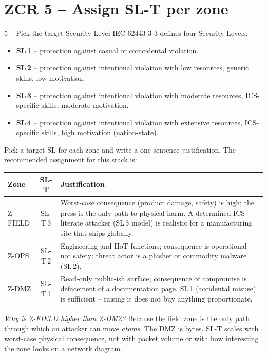 \documentclass[11pt,a4paper]{article}
\begin{document}
\section*{ZCR 5 -- Assign SL-T per zone}

\begin{stepbox}{5 -- Pick the target Security Level}
IEC 62443-3-3 defines four Security Levels:
\begin{itemize}\setlength{\itemsep}{1pt}
  \item \textbf{SL\,1} -- protection against casual or coincidental violation.
  \item \textbf{SL\,2} -- protection against intentional violation with low resources, generic skills, low motivation.
  \item \textbf{SL\,3} -- protection against intentional violation with moderate resources, ICS-specific skills, moderate motivation.
  \item \textbf{SL\,4} -- protection against intentional violation with extensive resources, ICS-specific skills, high motivation (nation-state).
\end{itemize}
Pick a target SL for each zone and write a one-sentence justification. The recommended assignment for this stack is:
\medskip

\noindent\small
\begin{tabular}{@{}p{} c p{}@{}}
\toprule
\textbf{Zone} & \textbf{SL-T} & \textbf{Justification} \\
\midrule
Z-FIELD & SL-T\,3 & Worst-case consequence (product damage, safety) is high; the press is the only path to physical harm. A determined ICS-literate attacker (SL\,3 model) is realistic for a manufacturing site that ships globally. \\
Z-OPS   & SL-T\,2 & Engineering and IIoT functions; consequence is operational not safety; threat actor is a phisher or commodity malware (SL\,2). \\
Z-DMZ   & SL-T\,1 & Read-only public-ish surface; consequence of compromise is defacement of a documentation page. SL\,1 (accidental misuse) is sufficient -- raising it does not buy anything proportionate. \\
\bottomrule
\end{tabular}
\medskip

\emph{Why is Z-FIELD higher than Z-DMZ?} Because the field zone is the only path through which an attacker can move \emph{atoms}. The DMZ is bytes. SL-T scales with worst-case physical consequence, not with packet volume or with how interesting the zone looks on a network diagram.
\end{stepbox}
\end{document}
